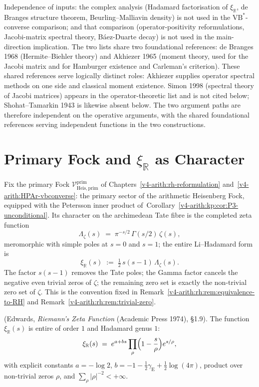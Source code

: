 Independence of inputs: the complex analysis (Hadamard
factorisation of \(\xi_{\mathbb R}\), de Branges structure theorem,
Beurling--Malliavin density) is not used in the
\(\mathrm{VB}^{*}\)-converse comparison; and that comparison
(operator-positivity
reformulations, Jacobi-matrix spectral theory, B\'aez-Duarte decay)
is not used in the main-direction implication. The two lists share two foundational references: de Branges 1968
(Hermite--Biehler theory) and Akhiezer 1965
(moment theory, used for the Jacobi matrix and for Hamburger
existence and Carleman's criterion). These shared
references serve logically distinct roles: Akhiezer supplies
operator spectral methods on one side and classical moment
existence.
Simon 1998 (spectral theory of Jacobi matrices) appears in the
operator-theoretic list and is not cited below; Shohat--Tamarkin 1943
is likewise absent below. The two argument paths are
therefore independent on the operative arguments, with the
shared foundational references serving independent functions in the
two constructions.

\section{Primary Fock and \(\xi_{\mathbb R}\) as Character}
\label{v4-arith:w5-j:primary-Fock}

Fix the primary Fock
\(\mathcal{V}^{\mathrm{prim}}_{\mathrm{Heis},\mathrm{prim}}\) of
Chapters~\ref{v4-arith:rh-reformulation}
and~\ref{v4-arith:HPAr-vbconverse}: the primary sector of the
arithmetic Heisenberg Fock, equipped with the Petersson inner
product of~Corollary~\ref{v4-arith:kp:cor:P3-unconditional}. Its character
on the archimedean Tate fibre is the completed zeta function
\[
\Lambda_{\zeta}(s)
\;=\;\pi^{-s/2}\,\Gamma(s/2)\,\zeta(s),
\]
meromorphic with simple poles at \(s=0\) and \(s=1\); the entire
Li--Hadamard form is
\[
\xi_{\mathbb R}(s)\;:=\;\tfrac12\,s(s-1)\,\Lambda_{\zeta}(s).
\]
The factor \(s(s-1)\) removes the Tate poles; the Gamma factor
cancels the negative even trivial zeros of \(\zeta\); the remaining
zero set is exactly the non-trivial zero set of \(\zeta\). This is
the convention fixed in
Remark~\ref{v4-arith:rh:rem:equivalence-to-RH} and
Remark~\ref{v4-arith:rh:rem:trivial-zero}.

\begin{proposition}
\label{v4-arith:w5-j:prop:xi-order}
\ClaimStatusProvedElsewhere (Edwards, \emph{Riemann's Zeta Function}
(Academic Press 1974), \S1.9). The function
\(\xi_{\mathbb R}(s)\) is entire of order \(1\) and Hadamard genus \(1\):
\begin{equation}
\label{v4-arith:w5-j:eq:hadamard}
\xi_{\mathbb R}(s)
\;=\;e^{a+bs}\prod_{\rho}\Bigl(1-\frac{s}{\rho}\Bigr)e^{s/\rho},
\end{equation}
with explicit constants
\(a=-\log 2\),
\(b=-1-\tfrac{1}{2}\gamma_{\mathrm{E}}+\tfrac{1}{2}\log(4\pi)\),
product over non-trivial zeros \(\rho\), and
\(\sum_{\rho}|\rho|^{-2}<+\infty\).
\end{proposition}

